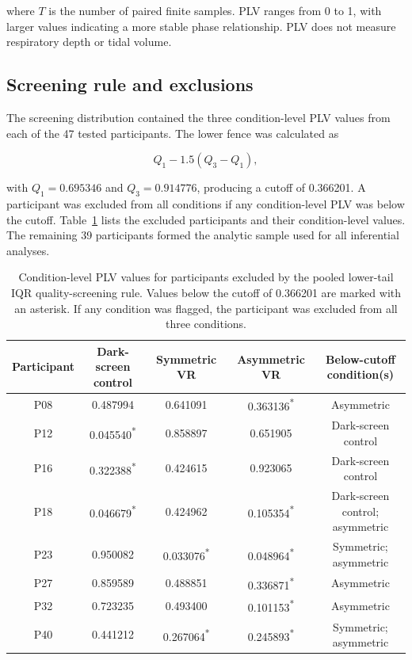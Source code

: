 \documentclass[pdflatex,sn-basic,lineno]{../sn-jnl}
\begin{document}
where $T$ is the number of paired finite samples. PLV ranges from 0 to 1, with larger values indicating a more stable phase relationship. PLV does not measure respiratory depth or tidal volume.

\subsection{Screening rule and exclusions}

The screening distribution contained the three condition-level PLV values from each of the 47 tested participants. The lower fence was calculated as

\begin{equation}
Q_1-1.5(Q_3-Q_1),
\end{equation}

with $Q_1=0.695346$ and $Q_3=0.914776$, producing a cutoff of 0.366201. A participant was excluded from all conditions if any condition-level PLV was below the cutoff. Table~\ref{tab:supp_plv_exclusions} lists the excluded participants and their condition-level values. The remaining 39 participants formed the analytic sample used for all inferential analyses.

\begin{table}[!htbp]
\centering
\small
\caption{Condition-level PLV values for participants excluded by the pooled lower-tail IQR quality-screening rule. Values below the cutoff of 0.366201 are marked with an asterisk. If any condition was flagged, the participant was excluded from all three conditions.}
\label{tab:supp_plv_exclusions}
\begingroup
\footnotesize
\setlength{\tabcolsep}{2pt}
\begin{tabular*}{\linewidth}{@{\extracolsep{\fill}}ccccc@{}}
\toprule
Participant & \shortstack{Dark-screen\\control} & Symmetric VR & Asymmetric VR & \shortstack{Below-cutoff\\condition(s)} \\
\midrule
P08 & 0.487994 & 0.641091 & 0.363136\textsuperscript{*} & Asymmetric \\
P12 & 0.045540\textsuperscript{*} & 0.858897 & 0.651905 & Dark-screen control \\
P16 & 0.322388\textsuperscript{*} & 0.424615 & 0.923065 & Dark-screen control \\
P18 & 0.046679\textsuperscript{*} & 0.424962 & 0.105354\textsuperscript{*} & \shortstack{Dark-screen control;\\asymmetric} \\
P23 & 0.950082 & 0.033076\textsuperscript{*} & 0.048964\textsuperscript{*} & \shortstack{Symmetric;\\asymmetric} \\
P27 & 0.859589 & 0.488851 & 0.336871\textsuperscript{*} & Asymmetric \\
P32 & 0.723235 & 0.493400 & 0.101153\textsuperscript{*} & Asymmetric \\
P40 & 0.441212 & 0.267064\textsuperscript{*} & 0.245893\textsuperscript{*} & \shortstack{Symmetric;\\asymmetric} \\
\bottomrule
\end{tabular*}
\endgroup
\end{table}
\end{document}
